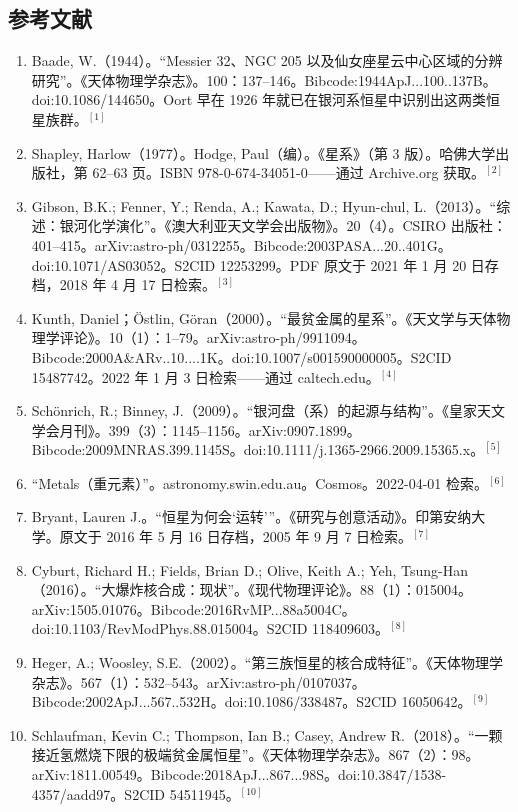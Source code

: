 \subsection{参考文献}
\begin{enumerate}
\item Baade, W.（1944）。“Messier 32、NGC 205 以及仙女座星云中心区域的分辨研究”。《天体物理学杂志》。100：137–146。Bibcode:1944ApJ...100..137B。doi:10.1086/144650。Oort 早在 1926 年就已在银河系恒星中识别出这两类恒星族群。$^{[1]}$
\item Shapley, Harlow（1977）。Hodge, Paul（编）。《星系》（第 3 版）。哈佛大学出版社，第 62–63 页。ISBN 978-0-674-34051-0——通过 Archive.org 获取。$^{[2]}$
\item Gibson, B.K.; Fenner, Y.; Renda, A.; Kawata, D.; Hyun-chul, L.（2013）。“综述：银河化学演化”。《澳大利亚天文学会出版物》。20（4）。CSIRO 出版社：401–415。arXiv:astro-ph/0312255。Bibcode:2003PASA...20..401G。doi:10.1071/AS03052。S2CID 12253299。PDF 原文于 2021 年 1 月 20 日存档，2018 年 4 月 17 日检索。$^{[3]}$
\item Kunth, Daniel；Östlin, Göran（2000）。“最贫金属的星系”。《天文学与天体物理学评论》。10（1）：1–79。arXiv:astro-ph/9911094。Bibcode:2000A&ARv..10....1K。doi:10.1007/s001590000005。S2CID 15487742。2022 年 1 月 3 日检索——通过 caltech.edu。$^{[4]}$
\item Schönrich, R.; Binney, J.（2009）。“银河盘（系）的起源与结构”。《皇家天文学会月刊》。399（3）：1145–1156。arXiv:0907.1899。Bibcode:2009MNRAS.399.1145S。doi:10.1111/j.1365-2966.2009.15365.x。$^{[5]}$
\item “Metals（重元素）”。astronomy.swin.edu.au。Cosmos。2022-04-01 检索。$^{[6]}$
\item Bryant, Lauren J.。“恒星为何会‘运转’”。《研究与创意活动》。印第安纳大学。原文于 2016 年 5 月 16 日存档，2005 年 9 月 7 日检索。$^{[7]}$
\item Cyburt, Richard H.; Fields, Brian D.; Olive, Keith A.; Yeh, Tsung-Han（2016）。“大爆炸核合成：现状”。《现代物理评论》。88（1）：015004。arXiv:1505.01076。Bibcode:2016RvMP...88a5004C。doi:10.1103/RevModPhys.88.015004。S2CID 118409603。$^{[8]}$
\item Heger, A.; Woosley, S.E.（2002）。“第三族恒星的核合成特征”。《天体物理学杂志》。567（1）：532–543。arXiv:astro-ph/0107037。Bibcode:2002ApJ...567..532H。doi:10.1086/338487。S2CID 16050642。$^{[9]}$
\item Schlaufman, Kevin C.; Thompson, Ian B.; Casey, Andrew R.（2018）。“一颗接近氢燃烧下限的极端贫金属恒星”。《天体物理学杂志》。867（2）：98。arXiv:1811.00549。Bibcode:2018ApJ...867...98S。doi:10.3847/1538-4357/aadd97。S2CID 54511945。$^{[10]}$

\end{enumerate}
